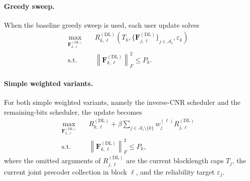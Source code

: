 \documentclass[11pt]{article}
\newcommand{\Aset}{\mathcal{A}}
\newcommand{\F}{\mathbf{F}}
\newcommand{\norm}[1]{\left\lVert #1 \right\rVert}
\newcommand{\DL}{\mathrm{DL}}
\begin{document}
\paragraph{Greedy sweep.}
When the baseline greedy sweep is used, each user update solves
\begin{subequations}
\begin{align}
\max_{\F_{k,\ell}^{(\DL)}}\quad
&
R_{k,\ell}^{(\DL)}\!\left(
T_k,
\{\F_{j,\ell}^{(\DL)}\}_{j \in \Aset_\ell},
\varepsilon_k
\right)
\label{prob:dl-greedy-precoder}
\\
\text{s.t.}\quad
&
\norm{\F_{k,\ell}^{(\DL)}}_F^2 \le P_k.
\label{prob:dl-greedy-precoder-power}
\end{align}
\end{subequations}

\paragraph{Simple weighted variants.}
For both simple weighted variants, namely the inverse-CNR scheduler and the remaining-bits scheduler, the update becomes
\begin{subequations}
\begin{align}
\max_{\F_{k,\ell}^{(\DL)}}\quad
&
R_{k,\ell}^{(\DL)}
+
\beta
\sum_{j \in \Aset_\ell \setminus \{k\}}
w_j^{(\ell)} R_{j,\ell}^{(\DL)}
\label{prob:dl-simple-weighted-precoder}
\\
\text{s.t.}\quad
&
\norm{\F_{k,\ell}^{(\DL)}}_F^2 \le P_k,
\label{prob:dl-simple-weighted-precoder-power}
\end{align}
\end{subequations}
where the omitted arguments of $R_{j,\ell}^{(\DL)}$ are the current blocklength caps $T_j$, the current joint precoder collection in block $\ell$, and the reliability target $\varepsilon_j$.
\end{document}

